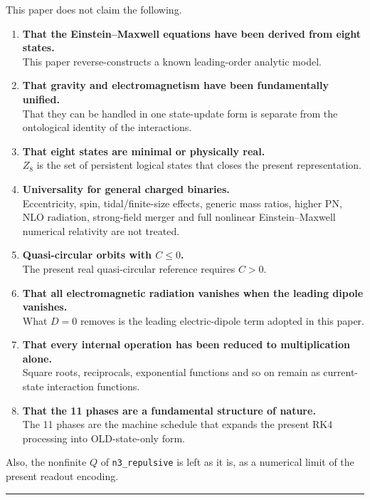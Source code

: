 \documentclass[
  a4paper,
]{article}
\begin{document}
This paper does not claim the following.

\begin{enumerate}
\def\labelenumi{\arabic{enumi}.}
\item
  \textbf{That the Einstein--Maxwell equations have been derived from
  eight states.}\\
  This paper reverse-constructs a known leading-order analytic model.
\item
  \textbf{That gravity and electromagnetism have been fundamentally
  unified.}\\
  That they can be handled in one state-update form is separate from the
  ontological identity of the interactions.
\item
  \textbf{That eight states are minimal or physically real.}\\
  \(Z_8\) is the set of persistent logical states that closes the
  present representation.
\item
  \textbf{Universality for general charged binaries.}\\
  Eccentricity, spin, tidal/finite-size effects, generic mass ratios,
  higher PN, NLO radiation, strong-field merger and full nonlinear
  Einstein--Maxwell numerical relativity are not treated.
\item
  \textbf{Quasi-circular orbits with \(C\le0\).}\\
  The present real quasi-circular reference requires \(C>0\).
\item
  \textbf{That all electromagnetic radiation vanishes when the leading
  dipole vanishes.}\\
  What \(D=0\) removes is the leading electric-dipole term adopted in
  this paper.
\item
  \textbf{That every internal operation has been reduced to
  multiplication alone.}\\
  Square roots, reciprocals, exponential functions and so on remain as
  current-state interaction functions.
\item
  \textbf{That the 11 phases are a fundamental structure of nature.}\\
  The 11 phases are the machine schedule that expands the present RK4
  processing into OLD-state-only form.
\end{enumerate}

Also, the nonfinite \(Q\) of \texttt{n3\_repulsive} is left as it is, as
a numerical limit of the present readout encoding.

\begin{center}\rule{0.5\linewidth}{0.5pt}\end{center}
\end{document}
